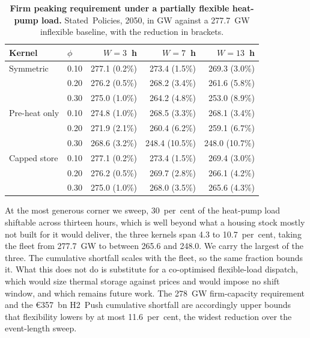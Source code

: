 \begin{table}[htbp]
 \centering
 \caption{\textbf{Firm peaking requirement under a
 partially flexible heat-pump load.} Stated~Policies, 2050, in GW against a 277.7~GW
 inflexible baseline, with the reduction in brackets.}
 \par{}
 \label{tab:hp_flex}
 \small
 \begin{tabular}{llrrr}
 \toprule
 Kernel & $\phi$ & $W=3$~h & $W=7$~h & $W=13$~h \\
 \midrule
 Symmetric & 0.10 & 277.1 (0.2\%) & 273.4 (1.5\%) & 269.3 (3.0\%) \\
           & 0.20 & 276.2 (0.5\%) & 268.2 (3.4\%) & 261.6 (5.8\%) \\
           & 0.30 & 275.0 (1.0\%) & 264.2 (4.8\%) & 253.0 (8.9\%) \\
 \midrule
 Pre-heat only & 0.10 & 274.8 (1.0\%) & 268.5 (3.3\%) & 268.1 (3.4\%) \\
               & 0.20 & 271.9 (2.1\%) & 260.4 (6.2\%) & 259.1 (6.7\%) \\
               & 0.30 & 268.6 (3.2\%) & 248.4 (10.5\%) & 248.0 (10.7\%) \\
 \midrule
 Capped store & 0.10 & 277.1 (0.2\%) & 273.4 (1.5\%) & 269.4 (3.0\%) \\
              & 0.20 & 276.2 (0.5\%) & 269.7 (2.8\%) & 266.1 (4.2\%) \\
              & 0.30 & 275.0 (1.0\%) & 268.0 (3.5\%) & 265.6 (4.3\%) \\
 \bottomrule
 \end{tabular}
 \par{}
\end{table}

At the most generous corner we sweep, 30~per~cent of the heat-pump load shiftable across
thirteen hours, which is well beyond what a housing stock mostly not built for it would
deliver, the three kernels span 4.3 to 10.7~per~cent, taking the fleet from 277.7~GW to
between 265.6 and 248.0. We carry the largest of the three. The cumulative shortfall
scales with the fleet, so the same fraction bounds it. What this does not do is
substitute for a co-optimised flexible-load dispatch, which would size thermal storage
against prices and would impose no shift window, and which remains future work. The
278~GW firm-capacity requirement and the \euro{}357~bn H2~Push cumulative shortfall are
accordingly upper bounds that flexibility lowers by at most 11.6~per~cent, the widest
reduction over the event-length sweep.


